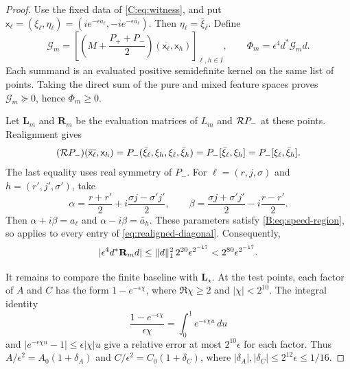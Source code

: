 \begin{proof}

Use the fixed data of \eqref{C:eq:witness}, and put
$\mathsf x_\ell=(\xi_\ell,\eta_\ell)
=(ie^{-\epsilon a_\ell},-ie^{-\epsilon\bar a_\ell})$.
Then $\eta_\ell=\bar\xi_\ell$.
Define
\begin{equation}\label{eq:evaluated-gram}
 \mathcal G_m=
 \left[
 \left(M+\frac{P_++P_-}{2}\right)(\overline{\mathsf x_\ell},\mathsf x_h)
 \right]_{\ell,h\in I},
 \qquad \Phi_m=\epsilon^4d^*\mathcal G_md.
\end{equation}
Each summand is an evaluated positive semidefinite kernel on the same
list of points. Taking the direct sum of the pure and mixed feature
spaces proves $\mathcal G_m\succeq0$, hence $\Phi_m\ge0$.

Let $\mathbf L_m$ and $\mathbf R_m$ be the evaluation matrices of
$L_m$ and $\mathcal{R} P_-$ at these points. Realignment gives
\begin{equation}\label{eq:realigned-diagonal}
 (\mathcal{R} P_-)(\overline{\mathsf x_\ell},\mathsf x_h)
 =P_-(\bar\xi_\ell,\xi_h,\xi_\ell,\bar\xi_h)
 =P_-[\bar\xi_\ell,\xi_h]=P_-[\xi_\ell,\bar\xi_h].
\end{equation}
The last equality uses real symmetry of $P_-$. For $\ell=(r,j,\sigma)$ and $h=(r',j',\sigma')$, take
\[
 \alpha=\frac{r+r'}2+i\frac{\sigma j-\sigma'j'}2,
 \qquad
 \beta=\frac{\sigma j+\sigma'j'}2-i\frac{r-r'}2.
\]
Then $\alpha+i\beta=a_\ell$ and $\alpha-i\beta=\bar a_h$.
These parameters satisfy \eqref{B:eq:speed-region}, so
 applies to every entry of
\eqref{eq:realigned-diagonal}. Consequently,
\begin{equation}\label{eq:realigned-error}
 |\epsilon^4d^*\mathbf R_md|
 \le\lVert d\rVert_1^2\,2^{20}\epsilon^{2^{-17}}
 <2^{80}\epsilon^{2^{-17}}.
\end{equation}

It remains to compare the finite baseline with $\mathbf L_\star$. At the test
points, each factor of $A$ and $C$ has the form $1-e^{-\epsilon\chi}$,
where $\Re\chi\ge2$ and $|\chi|<2^{10}$.
The integral identity
\[
 \frac{1-e^{-\epsilon\chi}}{\epsilon\chi}
 =\int_0^1e^{-\epsilon\chi u}\,du
\]
and $|e^{-\epsilon\chi u}-1|\le\epsilon|\chi|u$ give a relative
error at most $2^{10}\epsilon$ for each factor. Thus
$A/\epsilon^2=A_0(1+\delta_A)$ and
$C/\epsilon^2=C_0(1+\delta_C)$, where
$|\delta_A|,|\delta_C|\le2^{12}\epsilon\le1/16$.


\end{proof}
